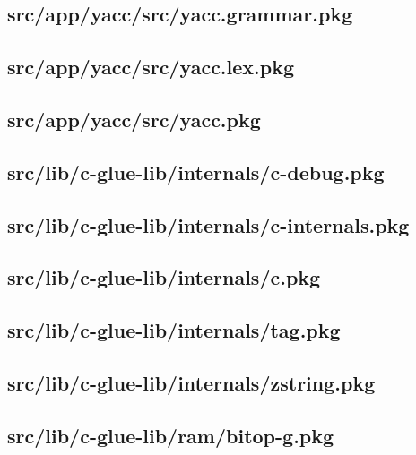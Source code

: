 \subsection{src/app/yacc/src/yacc.grammar.pkg}


\subsection{src/app/yacc/src/yacc.lex.pkg}


\subsection{src/app/yacc/src/yacc.pkg}


\subsection{src/lib/c-glue-lib/internals/c-debug.pkg}


\subsection{src/lib/c-glue-lib/internals/c-internals.pkg}


\subsection{src/lib/c-glue-lib/internals/c.pkg}


\subsection{src/lib/c-glue-lib/internals/tag.pkg}


\subsection{src/lib/c-glue-lib/internals/zstring.pkg}


\subsection{src/lib/c-glue-lib/ram/bitop-g.pkg}


